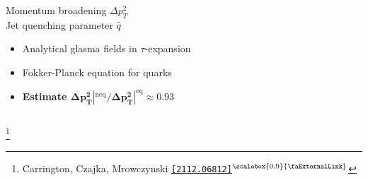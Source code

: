 \documentclass[aspectratio=169,11pt,usenames,dvipsnames]{beamer}
\renewcommand{\thefootnote}{\color{customblue}\faPaperPlaneO}
\newcommand\blfootnote[1]{%
  \begingroup
  \renewcommand\thefootnote{}\footnote{#1}%
  \addtocounter{footnote}{-1}%
  \endgroup
}
\begin{document}
\begin{frame}[t,noframenumbering]
\begin{columns}[onlytextwidth,t]
\begin{center}
            {\Large\color{isgold} Momentum broadening $\Delta p_T^2$ \\[5pt] Jet quenching parameter $\hat{q}$  \\[10pt]}
            \footnotesize
                \begin{itemize}
                    \item {\color{lightgray}Analytical glasma fields in $\tau$-expansion}
                    \item {\color{lightgray} Fokker-Planck equation for quarks}
                    \item {\color{lightgray} {\bfseries Estimate $\boldsymbol{\Delta p_T^2|^\mathrm{neq}/\Delta p_T^2|^\mathrm{eq}\approx 0.93}$}}
                \end{itemize}
        \end{center}
    \end{columns}
    \blfootnote{\scriptsize Carrington, Czajka, Mrowczynski \href{https://arxiv.org/abs/2112.06812}{\color{palgold}\texttt{[2112.06812]}$^\text{\scalebox{0.9}{\faExternalLink}}$}}
\end{frame}
   
\end{document}
